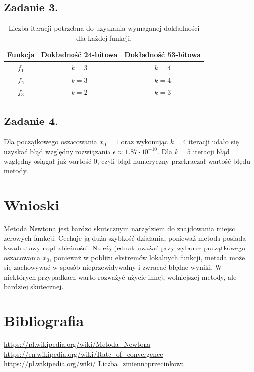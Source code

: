 \documentclass[11pt]{scrartcl}
\begin{document}
    \subsection{Zadanie 3.}
    \begin{table}[H]
        \centering
        \renewcommand{\arraystretch}{1.5}
        \begin{tabular}{|c|c|c|}
            \hline
            Funkcja & Dokładność 24-bitowa & Dokładność
                53-bitowa \\
            \hline
            $f_1$ & $k=3$ & $k=4$ \\
            \hline
            $f_2$ & $k=3$ & $k=4$ \\
            \hline
            $f_3$ & $k=2$ & $k=3$ \\
            \hline
        \end{tabular}
        \caption{Liczba iteracji potrzebna do uzyskania
            wymaganej dokładności dla każdej funkcji.}
    \end{table}

    \subsection{Zadanie 4.}
    Dla początkowego oszacowania $x_0=1$ oraz wykonując
    $k=4$ iteracji udało się uzyskać błąd względny rozwiązania
    $\epsilon \approx 1.87 \cdot 10^{-10}$. Dla $k=5$
    iteracji błąd względny osiągał już wartość 0, czyli
    błąd numeryczny przekraczał wartość błędu metody.

    \section{Wnioski}
    Metoda Newtona jest bardzo skutecznym narzędziem do
    znajdowania miejsc zerowych funkcji. Cechuje ją duża
    szybkość działania, ponieważ metoda posiada kwadratowy
    rząd zbieżności. Należy jednak uważać przy wyborze
    początkowego oszacowania $x_0$, ponieważ w pobliżu
    ekstremów lokalnych funkcji, metoda może się zachowywać
    w sposób nieprzewidywalny i zwracać błędne wyniki.
    W niektórych przypadkach warto rozważyć użycie innej,
    wolniejszej metody, ale bardziej skutecznej.

    \section{Bibliografia}
    \url{https://pl.wikipedia.org/wiki/Metoda_Newtona} \\
    \url{https://en.wikipedia.org/wiki/Rate_of_convergence} \\
    \url{https://pl.wikipedia.org/wiki/
        Liczba_zmiennoprzecinkowa}
\end{document}
